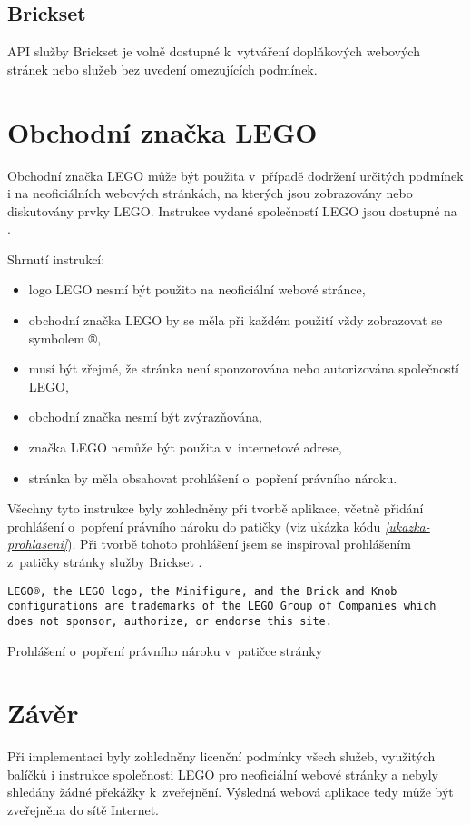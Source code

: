 \subsection{Brickset}
API služby Brickset je volně dostupné k~vytváření doplňkových webových stránek nebo služeb bez uvedení omezujících podmínek. \autocite{brickset:key} 

\section{Obchodní značka LEGO}
Obchodní značka LEGO může být použita v~případě dodržení určitých podmínek i na neoficiálních webových stránkách, na kterých jsou zobrazovány nebo diskutovány prvky LEGO. Instrukce vydané společností LEGO jsou dostupné na \autocite{lego:fair-play}.

Shrnutí instrukcí: 
\begin{itemize}
        \item logo LEGO nesmí být použito na neoficiální webové stránce,
        \item obchodní značka LEGO by se měla při každém použití vždy zobrazovat se symbolem ®,
        \item musí být zřejmé, že stránka není sponzorována nebo autorizována společností LEGO,
        \item obchodní značka nesmí být zvýrazňována,
        \item značka LEGO nemůže být použita v~internetové adrese,
        \item stránka by měla obsahovat prohlášení o~popření právního nároku.
\end{itemize}

Všechny tyto instrukce byly zohledněny při tvorbě aplikace, včetně přidání prohlášení o~popření právního nároku do patičky (viz ukázka kódu \emph{\ref{ukazka-prohlaseni}}). Při tvorbě tohoto prohlášení jsem se inspiroval prohlášením z~patičky stránky služby Brickset \autocite{brickset:about}.

\begin{listing}[htbp]
        \begin{verbatim}
LEGO®, the LEGO logo, the Minifigure, and the Brick and Knob 
configurations are trademarks of the LEGO Group of Companies which
does not sponsor, authorize, or endorse this site.
        \end{verbatim}
    \caption{Prohlášení o~popření právního nároku v~patičce stránky\label{ukazka-prohlaseni}}
\end{listing}

\section{Závěr}
Při implementaci byly zohledněny licenční podmínky všech služeb, využitých balíčků i instrukce společnosti LEGO pro neoficiální webové stránky a nebyly shledány žádné překážky k~zveřejnění. Výsledná webová aplikace tedy může být zveřejněna do sítě Internet.
